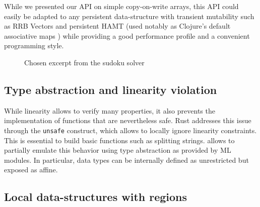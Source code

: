 While we presented our API on simple copy-on-write arrays, this API
could easily be adapted to any persistent data-structure with
transient mutability such as RRB Vectors \cite{DBLP:journals/pacmpl/Puente17}
and persistent HAMT (used notably as Clojure's default associative maps
\cite{bagwell2001ideal,clojurehamt}) while providing a good performance profile
and a convenient programming style.

\begin{figure}
  \centering
  \begin{minipage}[t]{0.45\linewidth}
    
  \end{minipage}\hfill
  \begin{minipage}[t]{0.54\linewidth}
    
  \end{minipage}
  \caption{Chosen excerpt from the sudoku solver}
  \label{ex:sudoku}
\end{figure}

\subsection{Type abstraction and linearity violation}

While linearity allows to verify many properties, it also prevents
the implementation of functions that are nevertheless safe. Rust addresses this
issue through the \lstinline/unsafe/ construct, which allows to locally
ignore linearity constraints. This is essential to build basic
functions such as splitting strings.
%
\lang allows to partially emulate this behavior using type abstraction
as provided by ML modules.
In particular, data types can be internally defined as unrestricted but exposed
as affine.


\subsection{Local data-structures with regions}


